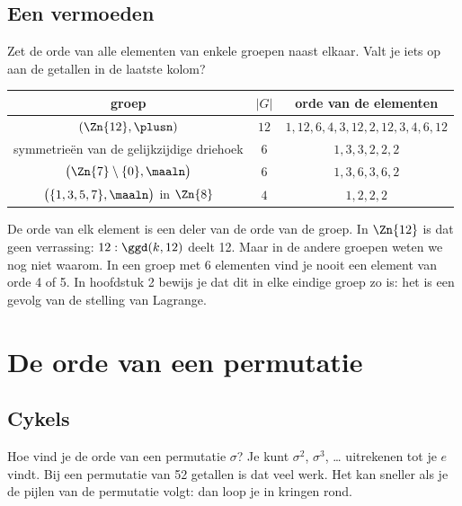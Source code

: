 \begin{oefeningen}
\end{oefeningen}

\subsection{Een vermoeden}

Zet de orde van alle elementen van enkele groepen naast elkaar. Valt je iets op aan de getallen in de laatste kolom?

\begin{center}
\renewcommand{\arraystretch}{1.3}
\begin{tabular}{|c|c|c|}
\hline
\rowcolor{accent!14} groep & $|G|$ & orde van de elementen \\ \hline
$(\Zn{12}, \plusn)$ & $12$ & $1, 12, 6, 4, 3, 12, 2, 12, 3, 4, 6, 12$ \\ \hline
symmetrieën van de gelijkzijdige driehoek & $6$ & $1, 3, 3, 2, 2, 2$ \\ \hline
$\bigl(\Zn{7} \setminus \{0\}, \maaln\bigr)$ & $6$ & $1, 3, 6, 3, 6, 2$ \\ \hline
$\bigl(\{1, 3, 5, 7\}, \maaln\bigr)$ in $\Zn{8}$ & $4$ & $1, 2, 2, 2$ \\ \hline
\end{tabular}
\end{center}

De orde van elk element is een deler van de orde van de groep. In $\Zn{12}$ is dat geen verrassing: $12 : \ggd(k, 12)$ deelt 12. Maar in de andere groepen weten we nog niet waarom. In een groep met 6 elementen vind je nooit een element van orde 4 of 5. In hoofdstuk 2 bewijs je dat dit in elke eindige groep zo is: het is een gevolg van de stelling van Lagrange.

\begin{oefeningen}
\end{oefeningen}

\section{De orde van een permutatie}

\subsection{Cykels}

Hoe vind je de orde van een permutatie $\sigma$? Je kunt $\sigma^2$, $\sigma^3$, \ldots{} uitrekenen tot je $e$ vindt. Bij een permutatie van 52 getallen is dat veel werk. Het kan sneller als je de pijlen van de permutatie volgt: dan loop je in kringen rond.

